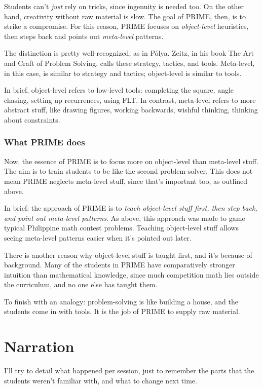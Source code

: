 \documentclass[11pt,paper=letter]{scrartcl}
\begin{document}
Students can't \emph{just} rely on tricks, since ingenuity is needed too. On the other hand, creativity without raw material is slow. The goal of PRIME, then, is to strike a compromise. For this reason, PRIME focuses on \emph{object-level} heuristics, then steps back and points out \emph{meta-level} patterns.

The distinction is pretty well-recognized, as in P\'olya. Zeitz, in his book The Art and Craft of Problem Solving, calls these strategy, tactics, and tools. Meta-level, in this case, is similar to strategy and tactics; object-level is similar to tools.

In brief, object-level refers to low-level tools: completing the square, angle chasing, setting up recurrences, using FLT. In contrast, meta-level refers to more abstract stuff, like drawing figures, working backwards, wishful thinking, thinking about constraints.

\subsubsection*{What PRIME does}

Now, the essence of PRIME is to focus more on object-level than meta-level stuff. The aim is to train students to be like the second problem-solver. This does not mean PRIME neglects meta-level stuff, since that's important too, as outlined above. 

In brief: the approach of PRIME is to \emph{teach object-level stuff first, then step back, and point out meta-level patterns}. As above, this approach was made to game typical Philippine math contest problems. Teaching object-level stuff allows seeing meta-level patterns easier when it's pointed out later.

There is another reason why object-level stuff is taught first, and it's because of background. Many of the students in PRIME have comparatively stronger intuition than mathematical knowledge, since much competition math lies outside the curriculum, and no one else has taught them. 

To finish with an analogy: problem-solving is like building a house, and the students come in with tools. It is the job of PRIME to supply raw material.

\section{Narration}

I'll try to detail what happened per session, just to remember the parts that the students weren't familiar with, and what to change next time.
\end{document}
